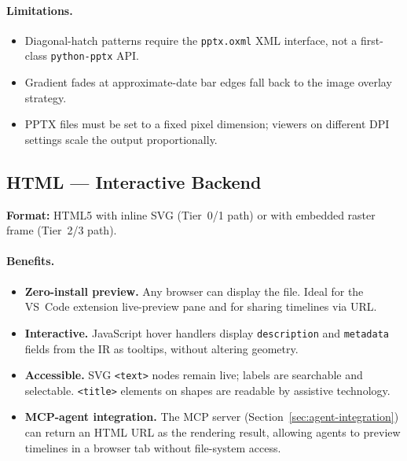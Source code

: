 \paragraph{Limitations.}
\begin{itemize}
  \item Diagonal-hatch patterns require the \texttt{pptx.oxml} XML interface, not a
        first-class \texttt{python-pptx} API.
  \item Gradient fades at approximate-date bar edges fall back to the image overlay
        strategy.
  \item PPTX files must be set to a fixed pixel dimension; viewers on different DPI
        settings scale the output proportionally.
\end{itemize}

\subsection{HTML --- Interactive Backend}
\label{sec:output-html}

\textbf{Format:} HTML5 with inline SVG (Tier~0/1 path) or with embedded raster frame
(Tier~2/3 path).

\paragraph{Benefits.}
\begin{itemize}
  \item \textbf{Zero-install preview.} Any browser can display the file. Ideal for the
        VS~Code extension live-preview pane and for sharing timelines via URL.
  \item \textbf{Interactive.} JavaScript hover handlers display \texttt{description}
        and \texttt{metadata} fields from the IR as tooltips, without altering geometry.
  \item \textbf{Accessible.} SVG \texttt{<text>} nodes remain live; labels are
        searchable and selectable. \texttt{<title>} elements on shapes are readable by
        assistive technology.
  \item \textbf{MCP-agent integration.} The MCP server (Section~\ref{sec:agent-integration})
        can return an HTML URL as the rendering result, allowing agents to preview timelines
        in a browser tab without file-system access.
\end{itemize}


